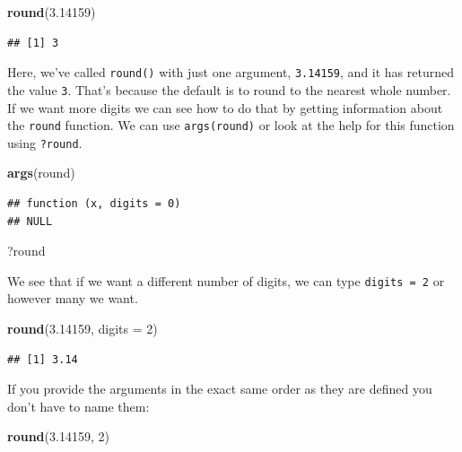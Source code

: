 \documentclass[]{book}
\newenvironment{Shaded}{\begin{snugshade}}{\end{snugshade}}
\newcommand{\KeywordTok}[1]{\textcolor[rgb]{0.13,0.29,0.53}{\textbf{#1}}}
\newcommand{\DataTypeTok}[1]{\textcolor[rgb]{0.13,0.29,0.53}{#1}}
\newcommand{\DecValTok}[1]{\textcolor[rgb]{0.00,0.00,0.81}{#1}}
\newcommand{\FloatTok}[1]{\textcolor[rgb]{0.00,0.00,0.81}{#1}}
\newcommand{\NormalTok}[1]{#1}
\begin{document}
\begin{Shaded}
\begin{Highlighting}[]
\KeywordTok{round}\NormalTok{(}\FloatTok{3.14159}\NormalTok{)}
\end{Highlighting}
\end{Shaded}

\begin{verbatim}
## [1] 3
\end{verbatim}

Here, we've called \texttt{round()} with just one argument,
\texttt{3.14159}, and it has returned the value \texttt{3}. That's
because the default is to round to the nearest whole number. If we want
more digits we can see how to do that by getting information about the
\texttt{round} function. We can use \texttt{args(round)} or look at the
help for this function using \texttt{?round}.

\begin{Shaded}
\begin{Highlighting}[]
\KeywordTok{args}\NormalTok{(round)}
\end{Highlighting}
\end{Shaded}

\begin{verbatim}
## function (x, digits = 0) 
## NULL
\end{verbatim}

\begin{Shaded}
\begin{Highlighting}[]
\NormalTok{?round}
\end{Highlighting}
\end{Shaded}

We see that if we want a different number of digits, we can type
\texttt{digits\ =\ 2} or however many we want.

\begin{Shaded}
\begin{Highlighting}[]
\KeywordTok{round}\NormalTok{(}\FloatTok{3.14159}\NormalTok{, }\DataTypeTok{digits =} \DecValTok{2}\NormalTok{)}
\end{Highlighting}
\end{Shaded}

\begin{verbatim}
## [1] 3.14
\end{verbatim}

If you provide the arguments in the exact same order as they are defined
you don't have to name them:

\begin{Shaded}
\begin{Highlighting}[]
\KeywordTok{round}\NormalTok{(}\FloatTok{3.14159}\NormalTok{, }\DecValTok{2}\NormalTok{)}
\end{Highlighting}
\end{Shaded}
\end{document}
